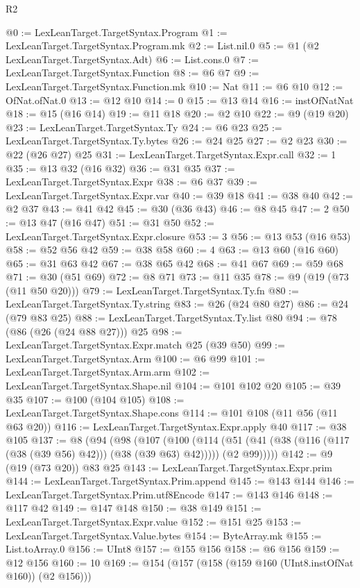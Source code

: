 \begin{lexlean}{R2}
\begin{coremodule}
@0 := LexLeanTarget.TargetSyntax.Program
@1 := LexLeanTarget.TargetSyntax.Program.mk
@2 := List.nil.{0}
@5 := @1 (@2 LexLeanTarget.TargetSyntax.Adt)
@6 := List.cons.{0}
@7 := LexLeanTarget.TargetSyntax.Function
@8 := @6 @7
@9 := LexLeanTarget.TargetSyntax.Function.mk
@10 := Nat
@11 := @6 @10
@12 := OfNat.ofNat.{0}
@13 := @12 @10
@14 := 0
@15 := @13 @14
@16 := instOfNatNat
@18 := @15 (@16 @14)
@19 := @11 @18
@20 := @2 @10
@22 := @9 (@19 @20)
@23 := LexLeanTarget.TargetSyntax.Ty
@24 := @6 @23
@25 := LexLeanTarget.TargetSyntax.Ty.bytes
@26 := @24 @25
@27 := @2 @23
@30 := @22 (@26 @27) @25
@31 := LexLeanTarget.TargetSyntax.Expr.call
@32 := 1
@35 := @13 @32 (@16 @32)
@36 := @31 @35
@37 := LexLeanTarget.TargetSyntax.Expr
@38 := @6 @37
@39 := LexLeanTarget.TargetSyntax.Expr.var
@40 := @39 @18
@41 := @38 @40
@42 := @2 @37
@43 := @41 @42
@45 := @30 (@36 @43)
@46 := @8 @45
@47 := 2
@50 := @13 @47 (@16 @47)
@51 := @31 @50
@52 := LexLeanTarget.TargetSyntax.Expr.closure
@53 := 3
@56 := @13 @53 (@16 @53)
@58 := @52 @56 @42
@59 := @38 @58
@60 := 4
@63 := @13 @60 (@16 @60)
@65 := @31 @63 @42
@67 := @38 @65 @42
@68 := @41 @67
@69 := @59 @68
@71 := @30 (@51 @69)
@72 := @8 @71
@73 := @11 @35
@78 := @9 (@19 (@73 (@11 @50 @20)))
@79 := LexLeanTarget.TargetSyntax.Ty.fn
@80 := LexLeanTarget.TargetSyntax.Ty.string
@83 := @26 (@24 @80 @27)
@86 := @24 (@79 @83 @25)
@88 := LexLeanTarget.TargetSyntax.Ty.list @80
@94 := @78 (@86 (@26 (@24 @88 @27))) @25
@98 := LexLeanTarget.TargetSyntax.Expr.match @25 (@39 @50)
@99 := LexLeanTarget.TargetSyntax.Arm
@100 := @6 @99
@101 := LexLeanTarget.TargetSyntax.Arm.arm
@102 := LexLeanTarget.TargetSyntax.Shape.nil
@104 := @101 @102 @20
@105 := @39 @35
@107 := @100 (@104 @105)
@108 := LexLeanTarget.TargetSyntax.Shape.cons
@114 := @101 @108 (@11 @56 (@11 @63 @20))
@116 := LexLeanTarget.TargetSyntax.Expr.apply @40
@117 := @38 @105
@137 := @8
    (@94
      (@98
        (@107
          (@100
            (@114 (@51 (@41 (@38 (@116 (@117 (@38 (@39 @56) @42))) (@38 (@39 @63) @42)))))
            (@2 @99)))))
@142 := @9 (@19 (@73 @20)) @83 @25
@143 := LexLeanTarget.TargetSyntax.Expr.prim
@144 := LexLeanTarget.TargetSyntax.Prim.append
@145 := @143 @144
@146 := LexLeanTarget.TargetSyntax.Prim.utf8Encode
@147 := @143 @146
@148 := @117 @42
@149 := @147 @148
@150 := @38 @149
@151 := LexLeanTarget.TargetSyntax.Expr.value
@152 := @151 @25
@153 := LexLeanTarget.TargetSyntax.Value.bytes
@154 := ByteArray.mk
@155 := List.toArray.{0}
@156 := UInt8
@157 := @155 @156
@158 := @6 @156
@159 := @12 @156
@160 := 10
@169 := @154 (@157 (@158 (@159 @160 (UInt8.instOfNat @160)) (@2 @156)))

\end{coremodule}
\end{lexlean}
